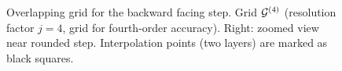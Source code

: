 \documentclass[11pt]{article}
\begin{document}
{
\begin{figure}[hbt]
\newcommand{\figWidth}{10cm}
\newcommand{\trimfig}[2]{\trimFigb{#1}{#2}{0.025}{.5}{.375}{.375}}
\newcommand{\figWidtha}{5.5cm}
\newcommand{\trimfiga}[2]{\trimFigb{#1}{#2}{0.0}{.0}{.0}{.0}}
\begin{center}\small
\caption{
Overlapping grid for the backward facing step. Grid ${\mathcal G}^{(4)}$ (resolution factor $j=4$, grid for fourth-order accuracy). Right: zoomed view near rounded step.
Interpolation points (two layers) are marked as black squares.
}
\label{fig:backStepGrids}
\end{center}
\end{figure}
}


\end{document}
